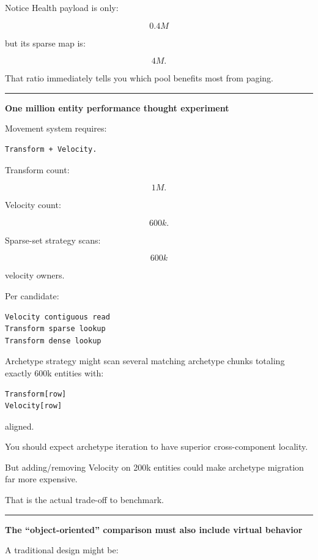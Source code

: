 Notice Health payload is only:

\[
0.4M
\]

but its sparse map is:

\[
4M.
\]

That ratio immediately tells you which pool benefits most from paging.

\begin{center}\rule{0.5\linewidth}{0.5pt}\end{center}

\textbf{One million entity performance thought experiment}

Movement system requires:

\begin{verbatim}
Transform + Velocity.
\end{verbatim}

Transform count:

\[
1M.
\]

Velocity count:

\[
600k.
\]

Sparse-set strategy scans:

\[
600k
\]

velocity owners.

Per candidate:

\begin{verbatim}
Velocity contiguous read
Transform sparse lookup
Transform dense lookup
\end{verbatim}

Archetype strategy might scan several matching archetype chunks totaling exactly 600k entities with:

\begin{verbatim}
Transform[row]
Velocity[row]
\end{verbatim}

aligned.

You should expect archetype iteration to have superior cross-component locality.

But adding/removing Velocity on 200k entities could make archetype migration far more expensive.

That is the actual trade-off to benchmark.

\begin{center}\rule{0.5\linewidth}{0.5pt}\end{center}

\textbf{The ``object-oriented'' comparison must also include virtual behavior}

A traditional design might be:


